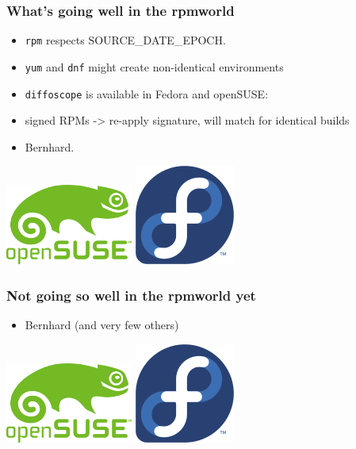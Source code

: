 \documentclass[14pt,aspectratio=169]{beamer}
\begin{document}
\begin{frame}
 \frametitle{What's going well in the rpmworld}
 \begin{itemize}
  \item \texttt{rpm} respects SOURCE\_DATE\_EPOCH.
  \item \texttt{yum} and \texttt{dnf} might create non-identical environments
  \item \texttt{diffoscope} is available in Fedora and openSUSE:
  \item signed RPMs -> re-apply signature, will match for identical builds
  \item<2> Bernhard.
  \end{itemize}
 \begin{center}
  \includegraphics[height=0.1\paperheight]{images/openSUSE.png}
  \hspace{0.1\paperwidth}
 \includegraphics[height=0.1\paperheight]{images/fedora.png}
  \hspace{0.1\paperwidth}
 \end{center}

\end{frame}


\begin{frame}
 \frametitle{Not going so well in the rpmworld yet}
 \begin{itemize}
	 \item Bernhard (and very few others)
  \end{itemize}
 \begin{center}
  \includegraphics[height=0.1\paperheight]{images/openSUSE.png}
  \hspace{0.1\paperwidth}
 \includegraphics[height=0.1\paperheight]{images/fedora.png}
  \hspace{0.1\paperwidth}
 \end{center}

\end{frame}
\end{document}
